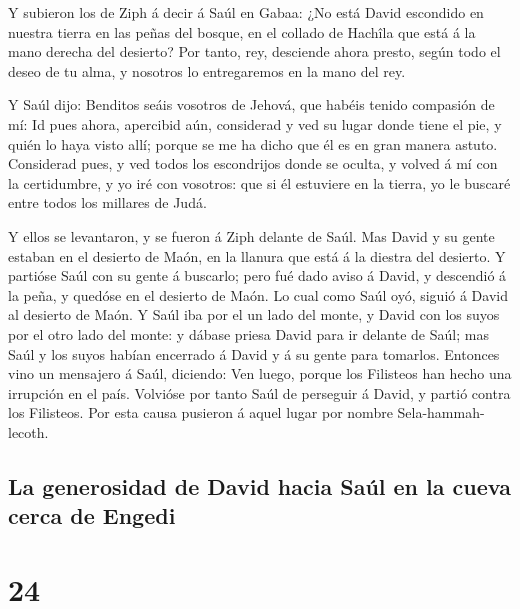 Y subieron los de Ziph á decir á Saúl en Gabaa: ¿No está
David escondido en nuestra tierra en las peñas del bosque, en el collado
de Hachîla que está á la mano derecha del desierto?  Por
tanto, rey, desciende ahora presto, según todo el deseo de tu alma, y
nosotros lo entregaremos en la mano del rey.

 Y Saúl dijo: Benditos seáis vosotros de Jehová, que
habéis tenido compasión de mí:  Id pues ahora, apercibid
aún, considerad y ved su lugar donde tiene el pie, y quién lo haya visto
allí; porque se me ha dicho que él es en gran manera astuto.
 Considerad pues, y ved todos los escondrijos donde se
oculta, y volved á mí con la certidumbre, y yo iré con vosotros: que si
él estuviere en la tierra, yo le buscaré entre todos los millares de
Judá.

 Y ellos se levantaron, y se fueron á Ziph delante de
Saúl. Mas David y su gente estaban en el desierto de Maón, en la llanura
que está á la diestra del desierto.  Y partióse Saúl con
su gente á buscarlo; pero fué dado aviso á David, y descendió á la peña,
y quedóse en el desierto de Maón. Lo cual como Saúl oyó, siguió á David
al desierto de Maón.  Y Saúl iba por el un lado del
monte, y David con los suyos por el otro lado del monte: y dábase priesa
David para ir delante de Saúl; mas Saúl y los suyos habían encerrado á
David y á su gente para tomarlos.  Entonces vino un
mensajero á Saúl, diciendo: Ven luego, porque los Filisteos han hecho
una irrupción en el país.  Volvióse por tanto Saúl de
perseguir á David, y partió contra los Filisteos. Por esta causa
pusieron á aquel lugar por nombre Sela-hammah-lecoth.

\hypertarget{la-generosidad-de-david-hacia-sauxfal-en-la-cueva-cerca-de-engedi}{%
\subsection{La generosidad de David hacia Saúl en la cueva cerca de
Engedi}\label{la-generosidad-de-david-hacia-sauxfal-en-la-cueva-cerca-de-engedi}}

\hypertarget{section-09-24}{%
\section{24}\label{section-09-24}}

